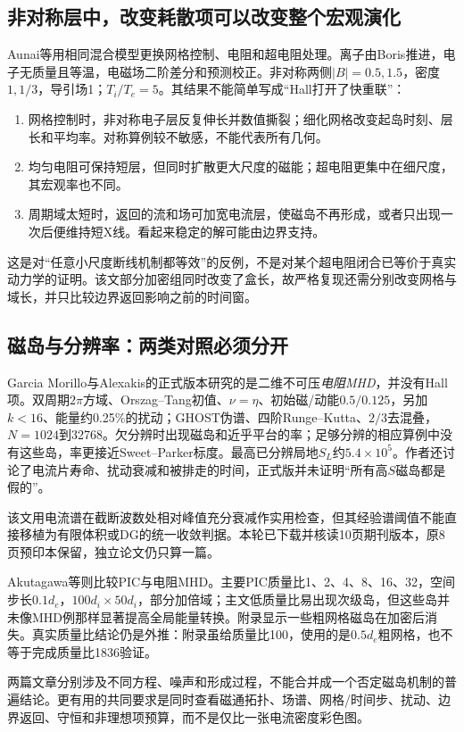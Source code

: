 \documentclass[UTF8,a4paper,11pt,openany,fontset=fandol]{ctexbook}
\begin{document}
\subsection{非对称层中，改变耗散项可以改变整个宏观演化}
Aunai等\citep{F625}用相同混合模型更换网格控制、电阻和超电阻处理。离子由Boris推进，电子无质量且等温，电磁场二阶差分和预测校正。非对称两侧$|B|=0.5,1.5$，密度$1,1/3$，导引场1；$T_i/T_e=5$。其结果不能简单写成“Hall打开了快重联”：
\begin{enumerate}
 \item 网格控制时，非对称电子层反复伸长并数值撕裂；细化网格改变起岛时刻、层长和平均率。对称算例较不敏感，不能代表所有几何。
 \item 均匀电阻可保持短层，但同时扩散更大尺度的磁能；超电阻更集中在细尺度，其宏观率也不同。
 \item 周期域太短时，返回的流和场可加宽电流层，使磁岛不再形成，或者只出现一次后便维持短X线。看起来稳定的解可能由边界支持。
\end{enumerate}
这是对“任意小尺度断线机制都等效”的反例，不是对某个超电阻闭合已等价于真实动力学的证明。该文部分加密组同时改变了盒长，故严格复现还需分别改变网格与域长，并只比较边界返回影响之前的时间窗。

\subsection{磁岛与分辨率：两类对照必须分开}
Garcia Morillo与Alexakis的正式版本\citep{F788}研究的是二维不可压\emph{电阻MHD}，并没有Hall项。双周期$2\pi$方域、Orszag--Tang初值、$\nu=\eta$、初始磁/动能$0.5/0.125$，另加$k<16$、能量约0.25\%的扰动；GHOST伪谱、四阶Runge--Kutta、$2/3$去混叠，$N=1024$到32768。欠分辨时出现磁岛和近乎平台的率；足够分辨的相应算例中没有这些岛，率更接近Sweet--Parker标度。最高已分辨局地$S_L$约$5.4\times10^5$。作者还讨论了电流片寿命、扰动衰减和被排走的时间，正式版并未证明“所有高$S$磁岛都是假的”。

该文用电流谱在截断波数处相对峰值充分衰减作实用检查，但其经验谱阈值不能直接移植为有限体积或DG的统一收敛判据。本轮已下载并核读10页期刊版本，原8页预印本保留，独立论文仍只算一篇。

Akutagawa等\citep{F606}则比较PIC与电阻MHD。主要PIC质量比1、2、4、8、16、32，空间步长$0.1d_e$，$100d_i\times50d_i$，部分加倍域；主文低质量比易出现次级岛，但这些岛并未像MHD例那样显著提高全局能量转换。附录显示一些粗网格磁岛在加密后消失。真实质量比结论仍是外推：附录虽给质量比100，使用的是$0.5d_e$粗网格，也不等于完成质量比1836验证。

两篇文章分别涉及不同方程、噪声和形成过程，不能合并成一个否定磁岛机制的普遍结论。更有用的共同要求是同时查看磁通拓扑、场谱、网格/时间步、扰动、边界返回、守恒和非理想项预算，而不是仅比一张电流密度彩色图。
\end{document}
